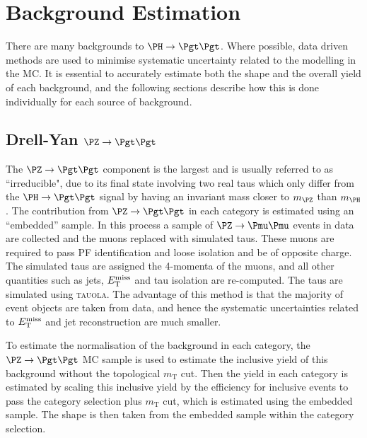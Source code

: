 \section{Background Estimation}
\label{sec:backgrounds}

There are many backgrounds to $\HToTauTau$. Where possible, data driven methods
are used to minimise systematic uncertainty related to the modelling in the
\ac{MC}. It is essential to accurately estimate both the shape and the overall
yield of each background, and the following sections describe how this is done
individually for each source of background.

\subsection{Drell-Yan $\PZ \to\Pgt\Pgt$}
\label{sec:backgroundEstimation_Ztautau}

The $\PZ \to \Pgt\Pgt$ component is the largest and is usually referred to as ``irreducible", due to its final
state involving two real taus which only differ from the $\PH \to \Pgt\Pgt$ signal by
having an invariant mass closer to $m_{\PZ}$ than $m_{\PH}$.
The contribution from $\ZToTauTau$ in each category is estimated using an
``embedded'' sample. In this process a sample of $\PZ\to\Pmu\Pmu$ events in data are
collected and the muons replaced with simulated taus. These muons are required
to pass \ac{PF} identification and loose isolation and be of opposite charge.
The simulated taus are assigned the 4-momenta of the muons, and all other
quantities such as jets, $E_{\mathrm{T}}^{\text{miss}}$ and tau isolation are re-computed. The taus
are simulated using \textsc{tauola}. 
The advantage of this method is that the majority of event objects
are taken from data, and hence the systematic uncertainties related to $E_{\mathrm{T}}^{\text{miss}}$
and jet reconstruction are much smaller. 

To estimate the normalisation of the background in each category, 
the $\ZToTauTau$ \ac{MC} sample is used to estimate 
the inclusive yield of this background without the topological $m_{\text{T}}$
cut. Then the yield in each category is estimated by scaling this inclusive yield by the efficiency for 
inclusive events to pass the category selection plus $m_{\text{T}}$ cut, which is estimated using the
embedded sample. The shape is then taken from the embedded sample within the
category selection.


